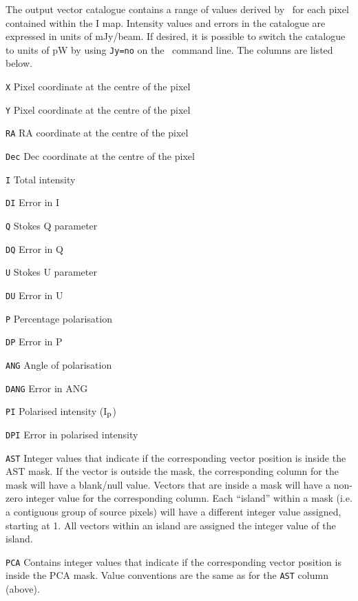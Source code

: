 The output vector catalogue contains a range of values derived by
\poltwomap\ for each pixel contained within the I map. Intensity values and
errors in the
catalogue are expressed in units of mJy/beam.  If desired, it is possible
to switch the catalogue to units of pW by using \texttt{Jy=no} on the \poltwomap\
command line.  The columns are listed below.

\begin{aligndesc}
\item[\texttt{X}] Pixel coordinate at the centre of the pixel
\item[\texttt{Y}] Pixel coordinate at the centre of the pixel
\item[\texttt{RA}] RA coordinate at the centre of the pixel
\item[\texttt{Dec}] Dec coordinate at the centre of the pixel
\item[\texttt{I}] Total intensity
\item[\texttt{DI}] Error in I
\item[\texttt{Q}] Stokes Q parameter
\item[\texttt{DQ}] Error in Q
\item[\texttt{U}] Stokes U parameter
\item[\texttt{DU}] Error in U
\item[\texttt{P}] Percentage polarisation
\item[\texttt{DP}] Error in P
\item[\texttt{ANG}] Angle of polarisation
\item[\texttt{DANG}] Error in ANG
\item[\texttt{PI}] Polarised intensity (I$_{\textnormal{p}}$)
\item[\texttt{DPI}] Error in polarised intensity
\item[\texttt{AST}] Integer values that indicate if the corresponding vector position is inside the AST mask. If the vector is outside the mask, the corresponding column for the mask will have a blank/null value. Vectors that are inside a mask will have a non-zero integer value for the corresponding column. Each ``island'' within a mask (i.e. a contiguous group of source pixels) will have a different integer value assigned, starting at 1. All vectors within an island  are assigned the integer value of the island. 
\item[\texttt{PCA}] Contains integer values that indicate if the corresponding vector position is inside the PCA mask. Value conventions are the same as for the \texttt{AST} column (above).
\end{aligndesc}


